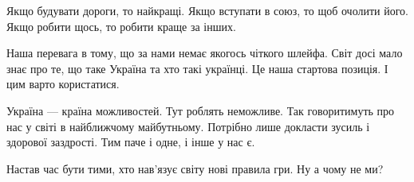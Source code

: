 Якщо будувати дороги, то найкращі. Якщо вступати в союз, то щоб очолити його.
Якщо робити щось, то робити краще за інших. 

Наша перевага в тому, що за нами немає якогось чіткого шлейфа. Світ досі мало
знає про те, що таке Україна та хто такі українці. Це наша стартова позиція. І
цим варто користатися.

Україна --- країна можливостей. Тут роблять неможливе. Так говоритимуть про нас у
світі в найближчому майбутньому. Потрібно лише докласти зусиль і здорової
заздрості. Тим паче і одне, і інше у нас є.

Настав час бути тими, хто нав’язує світу нові правила гри. Ну а чому не ми? 
